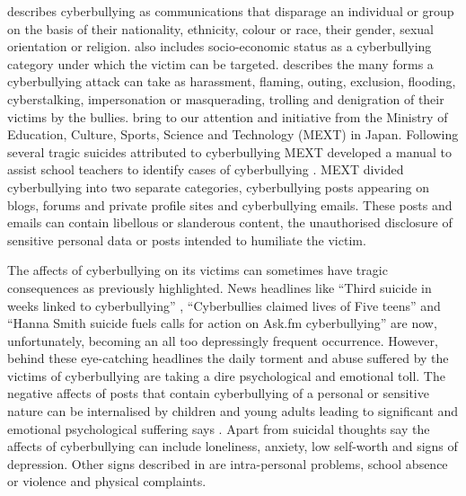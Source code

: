 \citet{chen_detecting_2012} describes cyberbullying as communications that disparage an individual or group on the basis of their nationality, ethnicity, colour or race, their gender, sexual orientation or religion. \citet{xu_learning_2012} also includes socio-economic status as a cyberbullying category under which the victim can be targeted. \citet{willard_cyberbullying_2006} \cite{willard_cyberbullying_2007} describes the many forms a cyberbullying attack can take as harassment, flaming, outing, exclusion, flooding, cyberstalking, impersonation or masquerading, trolling and denigration of their victims by the bullies. \citet{ptaszynski_michal_machine_2010} bring to our attention and initiative from the Ministry of Education, Culture, Sports, Science and Technology (MEXT) in Japan. Following several tragic suicides attributed to cyberbullying MEXT developed a manual to assist school teachers to identify cases of cyberbullying \cite{ministry_of_education_culture_sports_science_and_technology_netto_2008}. MEXT divided cyberbullying into two separate categories, cyberbullying posts appearing on blogs, forums and private profile sites and cyberbullying emails. These posts and emails can contain libellous or slanderous content, the unauthorised disclosure of sensitive personal data or posts intended to humiliate the victim.

The affects of cyberbullying on its victims can  sometimes have tragic consequences as previously highlighted. News headlines like ``Third suicide in weeks linked to cyberbullying'' \cite{Cionnaith:2102}, ``Cyberbullies claimed lives of Five teens'' \cite{Riegel:2013} and ``Hanna Smith suicide fuels calls for action on Ask.fm cyberbullying'' \cite{laura_smith-spark_hanna_2013} are now, unfortunately, becoming an all too depressingly frequent occurrence. However, behind these eye-catching headlines the daily torment and abuse suffered by the victims of cyberbullying are taking a dire psychological and emotional toll. The negative affects of posts that contain cyberbullying of a personal or sensitive nature can be internalised by children and young adults leading to significant and emotional psychological suffering says \citet{dinakar_modeling_2011}. Apart from suicidal thoughts \citet{xu_fast_2012} say the affects of cyberbullying can include loneliness, anxiety, low self-worth and signs of depression. Other signs described in \citet{xu_learning_2012} are intra-personal problems, school absence or violence and physical complaints.  

